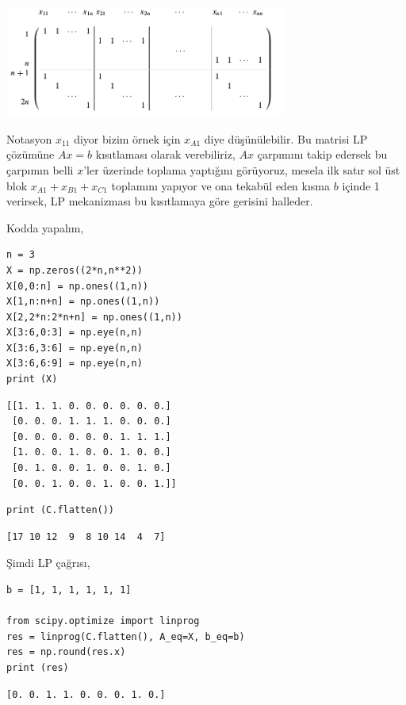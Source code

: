 \documentclass[12pt,fleqn]{article}\usepackage{../../common}
\begin{document}
\includegraphics[width=25em]{func_90_nflow_12.png}

Notasyon $x_{11}$ diyor bizim örnek için $x_{A1}$ diye düşünülebilir. Bu
matrisi LP çözümüne $Ax = b$ kısıtlaması olarak verebiliriz, $Ax$ çarpımını
takip edersek bu çarpımın belli $x$'ler üzerinde toplama yaptığını
görüyoruz, mesela ilk satır sol üst blok $x_{A1} + x_{B1} + x_{C1} $
toplamını yapıyor ve ona tekabül eden kısma $b$ içinde 1 verirsek, LP
mekanizması bu kısıtlamaya göre gerisini halleder.

Kodda yapalım,

\begin{verbatim}
n = 3
X = np.zeros((2*n,n**2))
X[0,0:n] = np.ones((1,n))
X[1,n:n+n] = np.ones((1,n))
X[2,2*n:2*n+n] = np.ones((1,n))
X[3:6,0:3] = np.eye(n,n)
X[3:6,3:6] = np.eye(n,n)
X[3:6,6:9] = np.eye(n,n)
print (X)
\end{verbatim}

\begin{verbatim}
[[1. 1. 1. 0. 0. 0. 0. 0. 0.]
 [0. 0. 0. 1. 1. 1. 0. 0. 0.]
 [0. 0. 0. 0. 0. 0. 1. 1. 1.]
 [1. 0. 0. 1. 0. 0. 1. 0. 0.]
 [0. 1. 0. 0. 1. 0. 0. 1. 0.]
 [0. 0. 1. 0. 0. 1. 0. 0. 1.]]
\end{verbatim}

\begin{verbatim}
print (C.flatten())
\end{verbatim}

\begin{verbatim}
[17 10 12  9  8 10 14  4  7]
\end{verbatim}

Şimdi LP çağrısı,

\begin{verbatim}
b = [1, 1, 1, 1, 1, 1]

from scipy.optimize import linprog
res = linprog(C.flatten(), A_eq=X, b_eq=b)
res = np.round(res.x)
print (res)
\end{verbatim}

\begin{verbatim}
[0. 0. 1. 1. 0. 0. 0. 1. 0.]
\end{verbatim}
\end{document}
